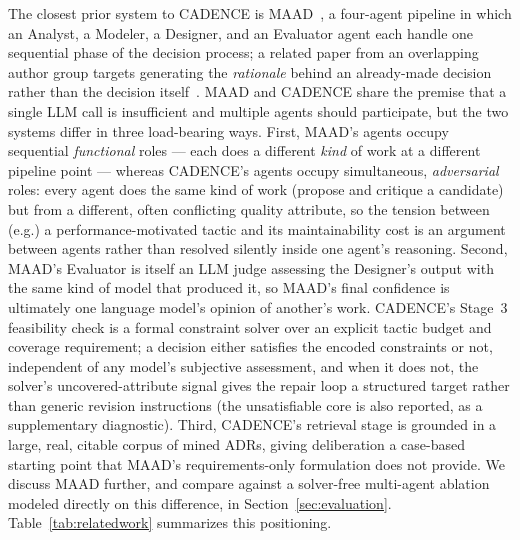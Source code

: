 \documentclass[lettersize,journal]{IEEEtran}
\begin{document}
The closest prior system to CADENCE is MAAD~\cite{maad2025}, a four-agent pipeline in which an Analyst, a Modeler, a Designer, and an Evaluator agent each handle one sequential phase of the decision process; a related paper from an overlapping author group targets generating the \emph{rationale} behind an already-made decision rather than the decision itself~\cite{zhou2025rationale}. MAAD and CADENCE share the premise that a single LLM call is insufficient and multiple agents should participate, but the two systems differ in three load-bearing ways. First, MAAD's agents occupy sequential \emph{functional} roles --- each does a different \emph{kind} of work at a different pipeline point --- whereas CADENCE's agents occupy simultaneous, \emph{adversarial} roles: every agent does the same kind of work (propose and critique a candidate) but from a different, often conflicting quality attribute, so the tension between (e.g.) a performance-motivated tactic and its maintainability cost is an argument between agents rather than resolved silently inside one agent's reasoning. Second, MAAD's Evaluator is itself an LLM judge assessing the Designer's output with the same kind of model that produced it, so MAAD's final confidence is ultimately one language model's opinion of another's work. CADENCE's Stage~3 feasibility check is a formal constraint solver over an explicit tactic budget and coverage requirement; a decision either satisfies the encoded constraints or not, independent of any model's subjective assessment, and when it does not, the solver's uncovered-attribute signal gives the repair loop a structured target rather than generic revision instructions (the unsatisfiable core is also reported, as a supplementary diagnostic). Third, CADENCE's retrieval stage is grounded in a large, real, citable corpus of mined ADRs, giving deliberation a case-based starting point that MAAD's requirements-only formulation does not provide. We discuss MAAD further, and compare against a solver-free multi-agent ablation modeled directly on this difference, in Section~\ref{sec:evaluation}. Table~\ref{tab:relatedwork} summarizes this positioning.
\end{document}
